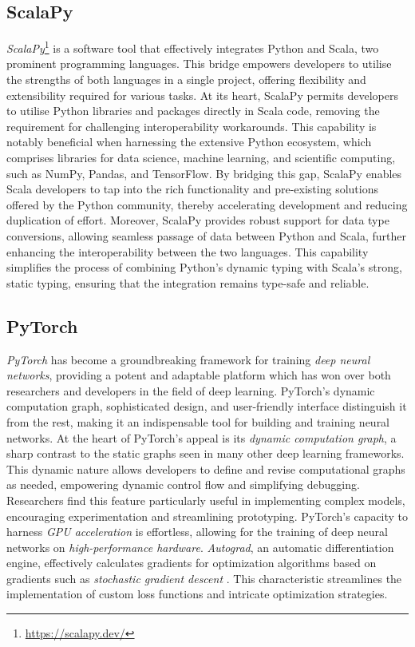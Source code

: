 \documentclass[12pt,a4paper,openright,twoside]{book}
\begin{document}
\subsection*{ScalaPy}
\emph{ScalaPy}\footnote{\url{https://scalapy.dev/}} is a software tool that effectively integrates Python and Scala, 
    two prominent programming languages. This bridge empowers developers to utilise the strengths of both languages 
    in a single project, offering flexibility and extensibility required for various tasks.
    At its heart, ScalaPy permits developers to utilise Python libraries and packages directly in Scala code, 
    removing the requirement for challenging interoperability workarounds. This capability is notably beneficial 
    when harnessing the extensive Python ecosystem, which comprises libraries for data science, machine learning, 
    and scientific computing, such as NumPy, Pandas, and TensorFlow. By bridging this gap, ScalaPy enables Scala developers
    to tap into the rich functionality and pre-existing solutions offered by the Python community, thereby accelerating 
    development and reducing duplication of effort.
    Moreover, ScalaPy provides robust support for data type conversions, allowing seamless passage of data between 
    Python and Scala, further enhancing the interoperability between the two languages. This capability simplifies 
    the process of combining Python's dynamic typing with Scala's strong, static typing, ensuring that the integration 
    remains type-safe and reliable.

\subsection*{PyTorch}

\emph{PyTorch} \cite{imambi2021pytorch} has become a groundbreaking framework for training \emph{deep neural networks}, providing a 
    potent and adaptable platform which has won over both researchers and developers in the field of deep learning. 
    PyTorch's dynamic computation graph, sophisticated design, and user-friendly interface distinguish it from the rest, 
    making it an indispensable tool for building and training neural networks.
    At the heart of PyTorch's appeal is its \emph{dynamic computation graph}, a sharp contrast to the static graphs seen in many 
    other deep learning frameworks. This dynamic nature allows developers to define and revise computational graphs as
    needed, empowering dynamic control flow and simplifying debugging. Researchers find this feature particularly useful 
    in implementing complex models, encouraging experimentation and streamlining prototyping.
    PyTorch's capacity to harness \emph{GPU acceleration} is effortless, allowing for the training of deep neural networks on 
    \emph{high-performance hardware}. \emph{Autograd}, an automatic differentiation engine, effectively calculates 
    gradients for optimization algorithms based on gradients such as \emph{stochastic gradient descent} \cite{amari1993backpropagation}. 
    This characteristic streamlines the implementation of custom loss functions and intricate optimization strategies.
\end{document}
